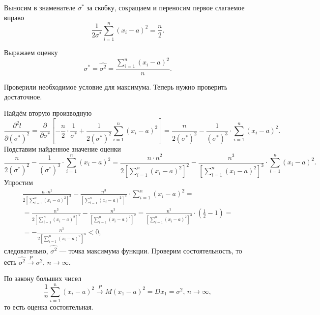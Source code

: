 Выносим в знаменателе $ \sigma^*$ за скобку, сокращаем и переносим первое слагаемое вправо
$$ \frac{1}{2 \sigma^*} \sum \limits_{i = 1}^n \left( x_i - a \right)^2 =
  \frac{n}{2}.$$

Выражаем оценку
$$ \sigma^* =
  \hat{ \sigma^2} =
  \frac{ \sum \limits_{i = 1}^n \left( x_i - a \right)^2}{n}.$$

Проверили необходимое условие для максимума.
Теперь нужно проверить достаточное.

Найдём вторую производную
$$ \frac{ \partial^2 l}{ \partial \left( \sigma^* \right)^2} =
  \frac{ \partial }{ \partial \sigma^*}
    \left[
      - \frac{n}{2} \cdot \frac{1}{ \sigma^*} +
      \frac{1}{2 \left( \sigma^* \right)^2} \sum \limits_{i = 1}^n \left( x_i - a \right)^2
    \right] =
  \frac{n}{2 \left( \sigma^* \right)^2} -
  \frac{1}{ \left( \sigma^* \right)^3} \cdot \sum \limits_{i = 1}^n \left( x_i - a \right)^2.$$
Подставим найденное значение оценки
$$ \frac{n}{2 \left( \sigma^* \right)^2} -
  \frac{1}{ \left( \sigma^* \right)^3} \cdot \sum \limits_{i = 1}^n \left( x_i - a \right)^2 =
  \frac{n \cdot n^2}{2 \left[ \sum \limits_{i = 1}^n \left( x_i - a \right)^2 \right]^2} -
  \frac{n^3}{ \left[ \sum \limits_{i = 1}^n \left( x_i - a \right)^2 \right]^3} \cdot
  \sum \limits_{i = 1}^n \left( x_i - a \right)^2.$$
Упростим
\begin{equation*}
  \begin{split}
    \frac{n \cdot n^2}{2 \left[ \sum \limits_{i = 1}^n \left( x_i - a \right)^2 \right]^2} -
    \frac{n^3}{ \left[ \sum \limits_{i = 1}^n \left( x_i - a \right)^2 \right]^3} \cdot
    \sum \limits_{i = 1}^n \left( x_i - a \right)^2 = \\
    = \frac{n^3}{2 \left[ \sum \limits_{i = 1}^n \left( x_i - a \right)^2 \right]^2} -
    \frac{n^3}{ \left[ \sum \limits_{i = 1}^n \left( x_i - a \right)^2 \right]^2} =
    \frac{n^3}{ \left[ \sum \limits_{i = 1}^n \left( x_i - a \right)^2 \right]^3} \cdot
    \left( \frac{1}{2} - 1 \right) = \\
    = - \frac{n^3}{2 \left[ \sum \limits_{i = 1}^n \left( x_i - a \right)^2 \right]^3} <
    0,
  \end{split}
\end{equation*}
следовательно, $ \hat{ \sigma^2}$ --- точка максимума функции.
Проверим состоятельность, то есть $ \hat{ \sigma^2} \overset{P}{ \to } \sigma^2, \, n \to \infty $.

По закону больших чисел
$$ \frac{1}{n} \sum \limits_{i = 1}^n \left( x_i - a \right)^2 \overset{P}{ \to }
  M \left( x_1 - a \right)^2 =
  Dx_1 =
  \sigma^2, \,
  n \to \infty,$$
то есть оценка состоятельная.
